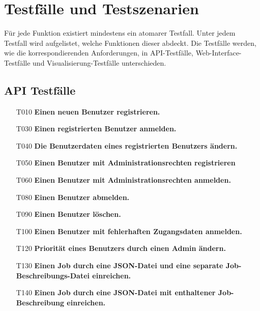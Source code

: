 \section{Testfälle und Testszenarien}
Für jede Funktion existiert mindestens ein atomarer Testfall. Unter jedem Testfall wird aufgelistet, welche Funktionen dieser abdeckt. Die Testfälle werden, wie die korrespondierenden Anforderungen, in API-Testfälle, Web-Interface-Testfälle und Visualisierung-Testfälle unterschieden.

\subsection{API Testfälle}


\begin{itemize}

    \item[T010] \textbf{Einen neuen Benutzer registrieren.}
    
    
    \item[T030] \textbf{Einen registrierten Benutzer anmelden.}
    
    \item[T040] \textbf{Die Benutzerdaten eines registrierten Benutzers ändern.}
    
    \item[T050] \textbf{Einen Benutzer mit Administrationsrechten registrieren}
    
    \item[T060] \textbf{Einen Benutzer mit Administrationsrechten anmelden.}
    
    \item[T080] \textbf{Einen Benutzer abmelden.}
    
    \item[T090] \textbf{Einen Benutzer löschen.}
    
    \item[T100] \textbf{Einen Benutzer mit fehlerhaften Zugangsdaten anmelden.}
    
    \item[T120] \textbf{Priorität eines Benutzers durch einen Admin ändern.}
    
    \item[T130] \textbf{Einen Job durch eine JSON-Datei und eine separate Job-Beschreibungs-Datei einreichen.}
    
    \item[T140] \textbf{Einen Job durch eine JSON-Datei mit enthaltener Job-Beschreibung einreichen.}
    

\end{itemize}
